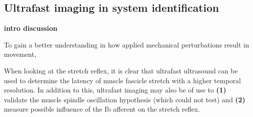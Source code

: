 


\subsection{Ultrafast imaging in system identification}


\textbf{intro discussion}

To gain a better understanding in how applied mechanical perturbations result in movement, 





When looking at the stretch reflex, it is clear that ultrafast ultrasound can be used to determine the latency of muscle fascicle stretch with a higher temporal resolution. In addition to this, ultrafast imaging may also be of use to \textbf{(1)} validate the muscle spindle oscillation hypothesis (which \citeauthor{cronin_triceps_2015} could not test) and \textbf{(2)} measure possible influence of the Ib afferent on the stretch reflex. 


